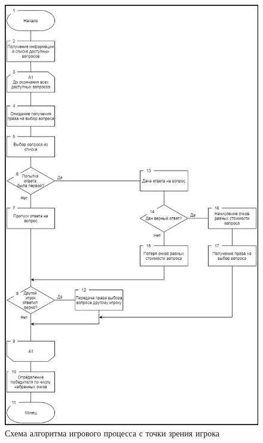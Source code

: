 \begin{figure}
\centering
	\includegraphics[scale=0.7]{attachments/game_player_alg.png}
	\caption{Схема алгоритма игрового процесса с точки зрения игрока}
	\label{fig:domain:model:game:player_alg}
\end{figure}

